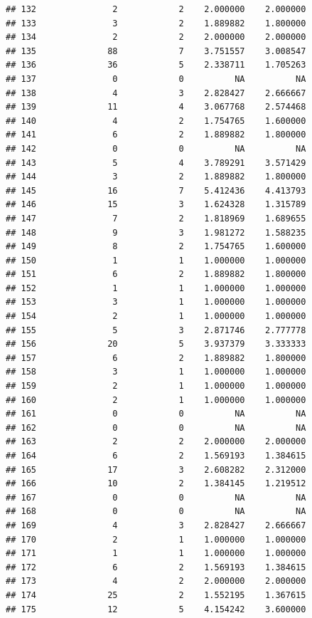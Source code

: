 \documentclass[
]{article}
\begin{document}
\begin{verbatim}
## 132               2            2    2.000000    2.000000
## 133               3            2    1.889882    1.800000
## 134               2            2    2.000000    2.000000
## 135              88            7    3.751557    3.008547
## 136              36            5    2.338711    1.705263
## 137               0            0          NA          NA
## 138               4            3    2.828427    2.666667
## 139              11            4    3.067768    2.574468
## 140               4            2    1.754765    1.600000
## 141               6            2    1.889882    1.800000
## 142               0            0          NA          NA
## 143               5            4    3.789291    3.571429
## 144               3            2    1.889882    1.800000
## 145              16            7    5.412436    4.413793
## 146              15            3    1.624328    1.315789
## 147               7            2    1.818969    1.689655
## 148               9            3    1.981272    1.588235
## 149               8            2    1.754765    1.600000
## 150               1            1    1.000000    1.000000
## 151               6            2    1.889882    1.800000
## 152               1            1    1.000000    1.000000
## 153               3            1    1.000000    1.000000
## 154               2            1    1.000000    1.000000
## 155               5            3    2.871746    2.777778
## 156              20            5    3.937379    3.333333
## 157               6            2    1.889882    1.800000
## 158               3            1    1.000000    1.000000
## 159               2            1    1.000000    1.000000
## 160               2            1    1.000000    1.000000
## 161               0            0          NA          NA
## 162               0            0          NA          NA
## 163               2            2    2.000000    2.000000
## 164               6            2    1.569193    1.384615
## 165              17            3    2.608282    2.312000
## 166              10            2    1.384145    1.219512
## 167               0            0          NA          NA
## 168               0            0          NA          NA
## 169               4            3    2.828427    2.666667
## 170               2            1    1.000000    1.000000
## 171               1            1    1.000000    1.000000
## 172               6            2    1.569193    1.384615
## 173               4            2    2.000000    2.000000
## 174              25            2    1.552195    1.367615
## 175              12            5    4.154242    3.600000

\end{verbatim}
\end{document}
